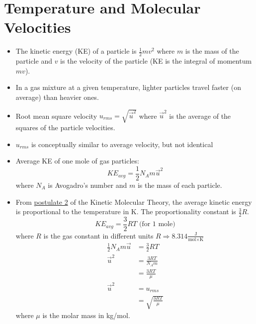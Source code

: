 \documentclass[
	chapter=5,
	title={Gases},
	showanswers=true,
]{chem122notes}
\begin{document}
\section{Temperature and Molecular Velocities}\label{sec:temperature-and-molecular-velocities}
\begin{itemize}
	\item The kinetic energy (KE) of a particle is $\frac{1}{2}mv^{2}$ where $m$ is the mass of the particle and $v$ is the velocity of the particle (KE is the integral of momentum $mv$).
	\item In a gas mixture at a given temperature, lighter particles travel faster (on average) than heavier ones.
	\item Root mean square velocity $u_{rms} = \sqrt{\vec{u}^{2}}$ where $\vec{u}^{2}$ is the average of the squares of the particle velocities.
	\item $u_{rms}$ is conceptually similar to average velocity, but not identical
	\item Average KE of one mole of gas particles:
	\begin{equation}
		KE_{avg} = \frac{1}{2}N_{A}m\vec{u}^{2} %
		\label{eq:gas-particles-KE}
	\end{equation}
	where $N_{A}$ is Avogadro's number and $m$ is the mass of each particle.
	\item From \hyperref[pos:kmt-2]{postulate 2} of the Kinetic Molecular Theory, the average kinetic energy is proportional to the temperature in K\@.
	The proportionality constant is $\frac{3}{2}R$.
	\begin{equation}
		KE_{avg} = \frac{3}{2}RT \mbox{    (for 1 mole)}
		\label{eq:average-ke}
	\end{equation}
	where $R$ is the gas constant in different units $R \Rightarrow 8.314 \frac{\mbox{J}}{\mbox{mol}\times\mbox{K}}$
	\begin{equation*}
	\begin{aligned}
		\frac{1}{2}N_{A}m\vec{u} &= \frac{3}{2}RT\\
		\vec{u}^{2} &= \frac{3RT}{N_{A}m}\\
				&= \frac{3RT}{\mu}\\
		\vec{u}^{2} &= u_{rms}\\
					&= \sqrt{\frac{3RT}{\mu}}
	\end{aligned}
	\end{equation*}
	where $\mu$ is the molar mass in kg/mol.
\end{itemize}
\end{document}
